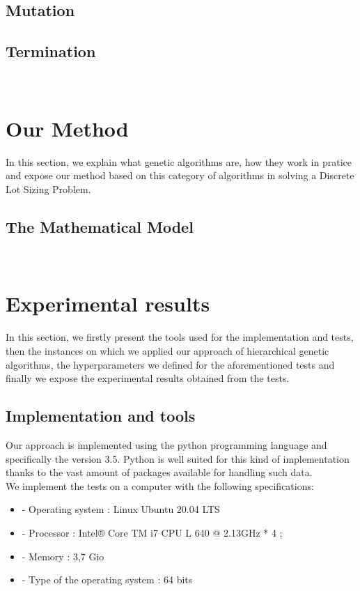 \documentclass[twocolumn,10pt]{asme2ej}
\begin{document}
\subsection{Mutation}

\subsection{Termination}
\\

\section{Our Method}
In this section, we explain what genetic algorithms are, how they work in pratice and expose our method based on this category of algorithms in solving a Discrete Lot Sizing Problem.

\subsection{The Mathematical Model}


\

\section{Experimental results \protect\footnotemark}

In this section, we firstly present the tools used for the implementation and tests, then the instances on which we applied our approach of hierarchical genetic algorithms, the hyperparameters we defined for the aforementioned tests and finally we expose the experimental results obtained from the tests.

\subsection{Implementation and tools}

Our approach is implemented using the python programming language and specifically the version 3.5. Python is well suited for this kind of implementation thanks to the vast amount of packages available for handling such data.\\
We implement the tests on a computer with the following specifications:
\begin{itemize}
    \item - Operating system : Linux Ubuntu 20.04 LTS
    \item - Processor : Intel® Core TM i7 CPU L 640 @ 2.13GHz * 4 ;
    \item - Memory : 3,7 Gio
    \item - Type of the operating system : 64 bits
\end{itemize}
\end{document}
